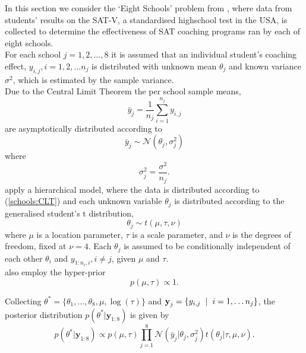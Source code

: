 \documentclass[12pt,a4paper]{article}\usepackage[]{graphicx}\usepackage[]{color}
\begin{document}
In this section we consider the `Eight Schools' problem from \citet{Gelman2014}, where data from students' results on the SAT-V, a standardised highschool test in the USA, is collected to determine the effectiveness of SAT coaching programs ran by each of eight schools. 
\\

For each school $j = 1, 2, \ldots, 8$ it is assumed that an individual student's coaching effect, $y_{i, j}, i = 1, 2, \dots n_j$ is distributed with unknown mean $\theta_j$ and known variance $\sigma^2$, which is estimated by the sample variance.
\\

Due to the Central Limit Theorem \citep{Casella2002} the per school sample means,
\begin{equation}
\label{schools:mean}
\bar{y}_j = \frac{1}{n_j} \sum_{i=1}^{n_j} y_{i, j}
\end{equation}
are asymptotically distributed according to
\begin{equation}
\label{schools:CLT}
\bar{y}_{j} \sim \mathcal{N}(\theta_j, \sigma^2_j)
\end{equation}
where
\begin{equation}
\label{schools:var}
\sigma_j^2 = \frac{\sigma^2}{n_j}.
\end{equation}
\citet{Gelman2014} apply a hierarchical model, where the data is distributed according to (\ref{schools:CLT}) and each unknown variable $\theta_j$ is distributed according to the generalised student's t distribution,
\begin{equation}
\label{schools:hier}
\theta_j \sim t(\mu, \tau, \nu)
\end{equation}
where $\mu$ is a location parameter, $\tau$ is a scale parameter, and $\nu$ is the degrees of freedom, fixed at $\nu = 4$. Each $\theta_j$ is assumed to be conditionally independent of each other $\theta_i$ and $y_{1:n_i, i}, i \neq j$, given $\mu$ and $\tau$. 
\\

\citet{Gelman2014} also employ the hyper-prior
\begin{equation}
\label{schools:hyperprior}
p(\mu, \tau) \propto 1.
\end{equation}

Collecting $\theta^* = \{\theta_1,  \ldots, \theta_8, \mu, \log(\tau)\}$ and $\textbf{y}_{j} = \{y_{i, j} \hspace{2mm}| \hspace{2mm} i = 1,\ldots n_j\}$, the posterior distribution $p(\theta^* | \textbf{y}_{1:8})$ is given by
\begin{equation}
\label{schools:posterior}
p(\theta^* | \textbf{y}_{1:8}) \propto  p(\mu, \tau) \prod_{j=1}^8 \mathcal{N}(\bar{y}_j | \theta_j, \sigma^2_j) t(\theta_j | \tau, \mu, \nu).
\end{equation}
\end{document}
